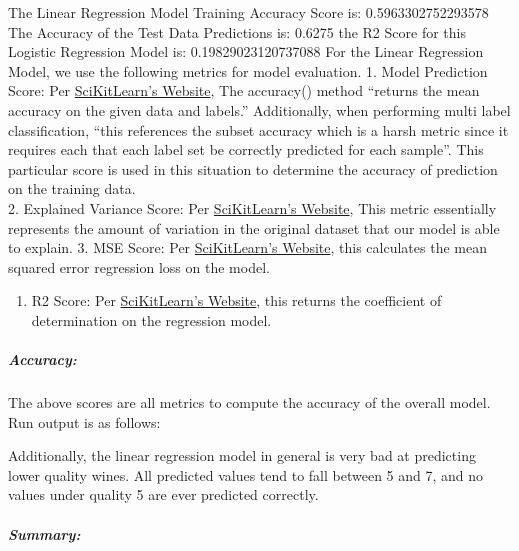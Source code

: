 \documentclass[11pt]{article}
\providecommand{\tightlist}{%
      \setlength{\itemsep}{0pt}\setlength{\parskip}{0pt}}
\begin{document}
The Linear Regression Model Training Accuracy Score is:
0.5963302752293578 The Accuracy of the Test Data Predictions is: 0.6275
the R2 Score for this Logistic Regression Model is: 0.19829023120737088
For the Linear Regression Model, we use the following metrics for model
evaluation. 1. Model Prediction Score: Per
\href{https://scikit-learn.org/stable/modules/generated/sklearn.linear_model.LogisticRegression.html\#sklearn.linear_model.LogisticRegression}{SciKitLearn's
Website}, The accuracy() method ``returns the mean accuracy on the given
data and labels.'' Additionally, when performing multi label
classification, ``this references the subset accuracy which is a harsh
metric since it requires each that each label set be correctly predicted
for each sample''. This particular score is used in this situation to
determine the accuracy of prediction on the training data.\\
2. Explained Variance Score: Per
\href{https://scikit-learn.org/stable/modules/generated/sklearn.metrics.explained_variance_score.html\#sklearn.metrics.explained_variance_score}{SciKitLearn's
Website}, This metric essentially represents the amount of variation in
the original dataset that our model is able to explain. 3. MSE Score:
Per
\href{https://scikit-learn.org/stable/modules/generated/sklearn.metrics.root_mean_squared_error.html\#sklearn.metrics.root_mean_squared_error}{SciKitLearn's
Website}, this calculates the mean squared error regression loss on the
model.

\begin{enumerate}
\def\labelenumi{\arabic{enumi}.}
\setcounter{enumi}{3}
\tightlist
\item
  R2 Score: Per
  \href{https://scikit-learn.org/stable/modules/generated/sklearn.metrics.r2_score.html\#sklearn.metrics.r2_score}{SciKitLearn's
  Website}, this returns the coefficient of determination on the
  regression model.
\end{enumerate}

\hypertarget{accuracy}{%
\subparagraph{Accuracy:}\label{accuracy}}

The above scores are all metrics to compute the accuracy of the overall
model. Run output is as follows:

Additionally, the linear regression model in general is very bad at
predicting lower quality wines. All predicted values tend to fall
between 5 and 7, and no values under quality 5 are ever predicted
correctly.

\hypertarget{summary}{%
\subparagraph{Summary:}\label{summary}}
\end{document}
